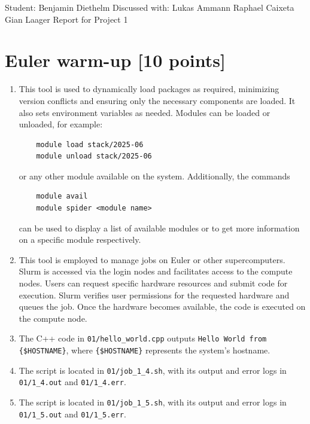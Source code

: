 \documentclass[unicode,10pt,a4paper,oneside,numbers=endperiod,openany]{scrartcl}
\begin{document}
\setassignment
{}

            {Student: Benjamin Diethelm}
            {Discussed with: Lukas Ammann \linebreak \null\hfill Raphael Caixeta \linebreak \null\hfill Gian Laager}
            {Report for Project 1}{}
\newline

\assignmentpolicy

\section{Euler warm-up [10 points]}

\begin{enumerate}
    \item This tool is used to dynamically load packages as required, minimizing version conflicts and ensuring only the necessary components are loaded. It also sets environment variables as needed. Modules can be loaded or unloaded, for example:
    \begin{verbatim}
    module load stack/2025-06
    module unload stack/2025-06
    \end{verbatim}
    or any other module available on the system. Additionally, the commands
    \begin{verbatim}
    module avail
    module spider <module name>
    \end{verbatim}
    can be used to display a list of available modules or to get more information on a specific module respectively.

    \item This tool is employed to manage jobs on Euler or other supercomputers. Slurm is accessed via the login nodes and facilitates access to the compute nodes. Users can request specific hardware resources and submit code for execution. Slurm verifies user permissions for the requested hardware and queues the job. Once the hardware becomes available, the code is executed on the compute node.

    \item The C++ code in \texttt{01/hello\_world.cpp} outputs \texttt{Hello World from \{\$HOSTNAME\}}, where \texttt{\{\$HOSTNAME\}} represents the system's hostname.

    \item The script is located in \texttt{01/job\_1\_4.sh}, with its output and error logs in \texttt{01/1\_4.out} and \texttt{01/1\_4.err}.
    \item The script is located in \texttt{01/job\_1\_5.sh}, with its output and error logs in \texttt{01/1\_5.out} and \texttt{01/1\_5.err}.
\end{enumerate}
\end{document}
